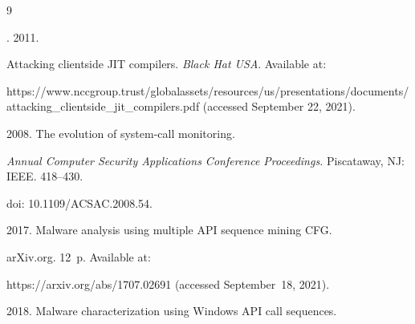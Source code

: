 







\renewcommand{\bibname}{\protect\rmfamily References}




{\small\frenchspacing

{%


\begin{thebibliography}{9}


. 2011.

Attacking clientside JIT compilers. \textit{Black Hat USA}. Available at: 

{\sf https://www.nccgroup.trust/globalassets/resources/us/\linebreak presentations/documents/attacking\_clientside\_jit\_compilers.pdf} (accessed September 22, 2021).






 2008. The evolution of system-call monitoring. 

\textit{Annual Computer Security Applications Conference Proceedings.} Piscataway, NJ: IEEE. 418--430. 

doi: 10.1109\!/\!ACSAC.2008.54.










 2017. Malware analysis using multiple API sequence mining CFG. 

{arXiv.org}. 12~p. Available at: 

{\sf https://arxiv.org/abs/1707.02691} (accessed September~18, 2021).




 2018. Malware characterization using Windows API call sequences. 


\end{thebibliography}}}
